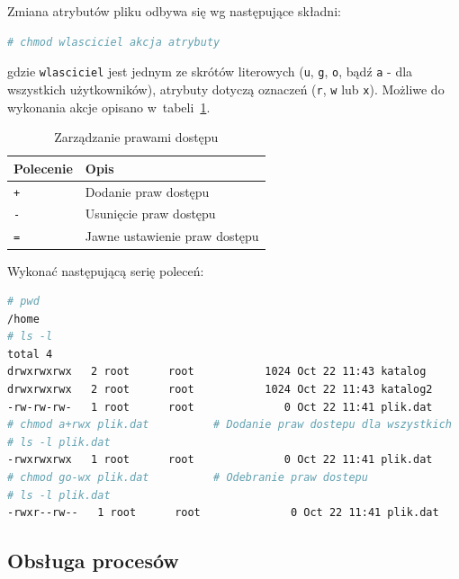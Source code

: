 \documentclass[11pt,twoside,a4paper]{article}
\begin{document}
\begin{example}
Zmiana atrybutów pliku odbywa się wg następujące składni:

\begin{lstlisting}[language=bash]
# chmod wlasciciel akcja atrybuty
\end{lstlisting}

gdzie \lstinline{wlasciciel} jest jednym ze skrótów literowych (\lstinline{u}, \lstinline{g}, \lstinline{o}, bądź \lstinline{a} - dla wszystkich użytkowników), atrybuty dotyczą oznaczeń (\lstinline{r}, \lstinline{w} lub \lstinline{x}). Możliwe do wykonania akcje opisano w~tabeli~\ref{tab:zarzadzanie}.

\begin{table}[h!]
\centering
\caption{Zarządzanie prawami dostępu}
\setlength{\arrayrulewidth}{1pt}
\setlength{\tabcolsep}{6pt}
\renewcommand{\arraystretch}{1.2}
\begin{tabular}{ |p{}|p{}|}
\hline \rowcolor{gray}
\textbf{Polecenie} & \textbf{Opis} \\ \hline
\mbox{\lstinline{+}} & Dodanie praw dostępu \\ \hline 
\mbox{\lstinline{-}} & Usunięcie praw dostępu \\ \hline 
\mbox{\lstinline{=}}  & Jawne ustawienie praw dostępu \\ \hline
\end{tabular}
\label{tab:zarzadzanie}
\end{table}

Wykonać następującą serię poleceń: 

\begin{lstlisting}[language=bash]
# pwd
/home
# ls -l
total 4
drwxrwxrwx   2 root      root           1024 Oct 22 11:43 katalog
drwxrwxrwx   2 root      root           1024 Oct 22 11:43 katalog2
-rw-rw-rw-   1 root      root              0 Oct 22 11:41 plik.dat
# chmod a+rwx plik.dat			# Dodanie praw dostepu dla wszystkich
# ls -l plik.dat 
-rwxrwxrwx   1 root      root              0 Oct 22 11:41 plik.dat
# chmod go-wx plik.dat			# Odebranie praw dostepu
# ls -l plik.dat 
-rwxr--rw--   1 root      root              0 Oct 22 11:41 plik.dat
\end{lstlisting}



\end{example}


\subsection{Obsługa procesów}
\end{document}
